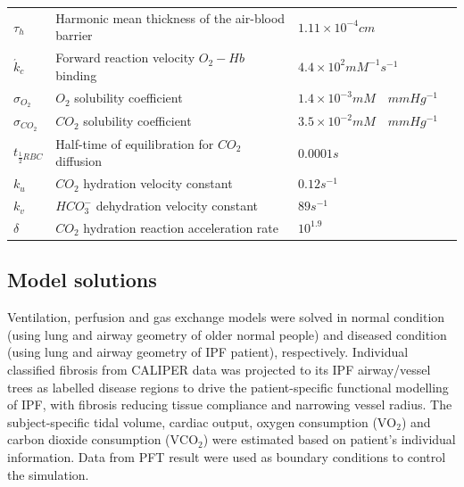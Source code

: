 \begin{landscape}
\begin{table}[htbp]
\begin{tabular}{p{2.2cm} p{7.5cm} p{5.2cm} p{4.8cm}}
$\tau_h$ & Harmonic mean thickness of the air-blood barrier & $1.11 \times 10^{-4}cm$ & \cite{weibel1993morphometric} \\
$\acute{k}_c$ & Forward reaction velocity $O_2-Hb$ binding & $4.4 \times 10^{2}mM^{-1}s^{-1}$ & \cite{weibel1997design} \\
$\sigma_{O_2}$ & $O_2$ solubility coefficient & $1.4 \times 10^{-3}mM \quad mmHg^{-1}$ & \cite{keener1998mathematical} \\
$\sigma_{CO_2}$ & $CO_2$ solubility coefficient & $3.5 \times 10^{-2}mM \quad mmHg^{-1}$ & \cite{keener1998mathematical} \\
$t_{\frac{1}{2}RBC}$ & Half-time of equilibration for $CO_2$ diffusion & $0.0001 s$ & \cite{hill1973mathematical} \\
$k_u$ & $CO_2$ hydration velocity constant & $0.12s^{-1}$ & \cite{hill1973mathematical} \\
$k_v$ & $HCO^{-}_3$ dehydration velocity constant & $89s^{-1}$ & \cite{hill1973mathematical} \\
$\delta$ & $CO_2$ hydration reaction acceleration rate & $10^{1.9}$ & \cite{ben2006simplified} \\
\hline
\end{tabular}
\end{table}
\end{landscape}
\restoregeometry

\subsection{Model solutions}
Ventilation, perfusion and gas exchange models were solved in normal condition (using lung and airway geometry of older normal people) and diseased condition (using lung and airway geometry of IPF patient), respectively. Individual classified fibrosis from CALIPER data was projected to its IPF airway/vessel trees as labelled disease regions to drive the patient-specific functional modelling of IPF, with fibrosis reducing tissue compliance and narrowing vessel radius. The subject-specific tidal volume, cardiac output, oxygen consumption ($\mathrm{VO_2}$) and carbon dioxide consumption ($\mathrm{VCO_2}$) were estimated based on patient's individual information. Data from PFT result were used as boundary conditions to control the simulation.

